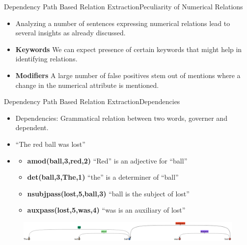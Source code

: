 \documentclass{beamer}
\begin{document}
\begin{frame}{Dependency Path Based Relation Extraction}{Peculiarity of Numerical Relations}
\begin{itemize}
 \item Analyzing a number of sentences expressing numerical relations lead to several insights as already discussed. \\
 \item \textbf{Keywords} We can expect presence of certain keywords that might help in identifying relations.\\
 \item \textbf{Modifiers} A large number of false positives stem out of mentions where a change in the numerical attribute is mentioned.
\end{itemize}
\end{frame}

\begin{frame}{Dependency Path Based Relation Extraction}{Dependencies}
\begin{itemize}
 \item Dependencies: Grammatical relation between two words, governer and dependent. \\
 \item ``The red ball was lost'' \\
\item \begin{itemize}
\item \textbf{amod(ball,3,red,2)} ``Red'' is an adjective for ``ball''
\item \textbf{det(ball,3,The,1)}  ``the'' is a determiner of ``ball''
\item \textbf{nsubjpass(lost,5,ball,3)}	``ball is the subject of lost''
\item \textbf{auxpass(lost,5,was,4)}	``was is an auxiliary of lost''
\end {itemize}
\end{itemize}
\begin{figure}[h]
 \centering
 \includegraphics[bb=0 0 1281 118,scale=0.25]{./imgs/dep.png}
\end{figure}

\end{frame}
\end{document}
